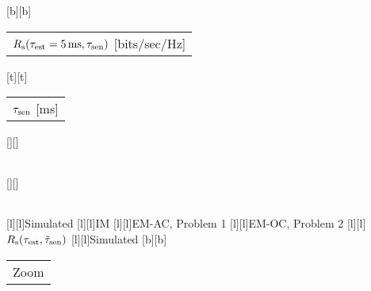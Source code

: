 %    
%
%
%
[b][b]{\fontsize{8}{12}\selectfont \color[rgb]{0,0,0}\setlength{\tabcolsep}{0pt}\begin{tabular}{c}$R_{\text{s}}(\tau_{\text{est}} = \SI{5}{ms}, \tau_{\text{sen}})$ [bits/sec/Hz]\end{tabular}}%
[t][t]{\fontsize{8}{12}\selectfont \color[rgb]{0,0,0}\setlength{\tabcolsep}{0pt}\begin{tabular}{c}$\tau_{\text{sen}}$ [ms]\end{tabular}}%
[][]{\fontsize{10}{15}\selectfont \color[rgb]{0,0,0}\setlength{\tabcolsep}{0pt}\begin{tabular}{c} \end{tabular}}%
[][]{\fontsize{10}{15}\selectfont \color[rgb]{0,0,0}\setlength{\tabcolsep}{0pt}\begin{tabular}{c} \end{tabular}}%
[l][l]{\fontsize{8}{12}\selectfont \color[rgb]{0,0,0}Simulated}%
[l][l]{\fontsize{8}{12}\selectfont \color[rgb]{0,0,0}IM}%
[l][l]{\fontsize{8}{12}\selectfont \color[rgb]{0,0,0}EM-AC, Problem 1}%
[l][l]{\fontsize{8}{12}\selectfont \color[rgb]{0,0,0}EM-OC, Problem 2}%
[l][l]{\fontsize{8}{12}\selectfont \color[rgb]{0,0,0}$R_{\text{s}}(\tau_{\text{est}},\tilde{\tau}_{\text{sen}})$}%
[l][l]{\fontsize{8}{12}\selectfont \color[rgb]{0,0,0}Simulated}%
[b][b]{\fontsize{8}{12}\selectfont \color[rgb]{0,0,0}\setlength{\tabcolsep}{0pt}\begin{tabular}{c}Zoom\end{tabular}}%
